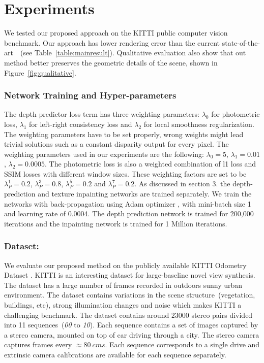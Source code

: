 \documentclass[runningheads]{llncs}
\begin{document}
\section{Experiments}
We tested our proposed approach on the KITTI \cite{geiger2012we} public computer vision benchmark. Our approach has lower rendering error than the current state-of-the-art~\cite{flynn2015deepstereo}~(see Table~\ref{table:mainresult}). Qualitative evaluation also show that out method better preserves the geometric details of the scene, shown in Figure~\ref{fig:qualitative}. 
\subsubsection*{Network Training and Hyper-parameters}
The depth predictor loss term has three weighting parameters: $\lambda_{0}$ for photometric loss, $\lambda_{1}$ for left-right consistency loss and $\lambda_{2}$ for local smoothness regularization. The weighting parameters have to be set properly, wrong weights might lead trivial solutions such as a constant disparity output for every pixel. The weighting parameters used in our experiments are the following: $\lambda_{0}=5$, $\lambda_{1}=0.01$, $\lambda_{2}=0.0005$. The photometric loss is also a weighted combination of l1 loss and SSIM losses with different window sizes. These weighting factors are set to be $\lambda^{1}_{P}=0.2$, $\lambda^{3}_{P}=0.8$, $\lambda^{5}_{P}=0.2$ and $\lambda^{7}_{P}=0.2$. As discussed in section 3. the depth-prediction and texture inpainting networks are trained separately. We train the networks with back-propagation using Adam optimizer \cite{kingma2014adam}, with mini-batch size 1 and learning rate of 0.0004. The depth prediction network is trained for 200,000 iterations and the inpainting network is trained for 1 Million iterations.
\subsubsection*{Dataset:} We evaluate our proposed method on the publicly available KITTI Odometry Dataset \cite{geiger2012we}. KITTI is an interesting dataset for large-baseline novel view synthesis. The dataset has a large number of frames recorded in outdoors sunny urban environment. The dataset contains variations in the scene structure~(vegetation, buildings, etc), strong illumination changes and noise which makes KITTI a challenging benchmark. The dataset contains around $23000$ stereo pairs divided into 11 sequences~(\textit{00} to \textit{10}). Each sequence contains a set of images captured by a stereo camera, mounted on top of car driving through a city. The stereo camera captures frames every $\approx 80~cms$. Each sequence corresponds to a single drive and extrinsic camera calibrations are available for each sequence separately.
\end{document}
